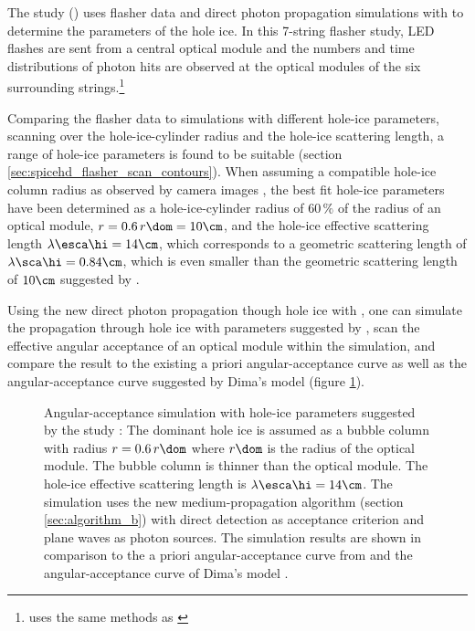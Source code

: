 The  study () uses flasher data and direct photon propagation simulations with \ppc to determine the parameters of the hole ice. In this 7-string flasher study, LED flashes are sent from a central optical module and the numbers and time distributions of photon hits are observed at the optical modules of the six surrounding strings.\footnote{ uses the same methods as \cite{icepaper,dimaslikelihood}}

Comparing the flasher data to simulations with different hole-ice parameters, scanning over the hole-ice-cylinder radius and the hole-ice scattering length, a range of hole-ice parameters is found to be suitable (section \ref{sec:spicehd_flasher_scan_contours}). When assuming a compatible hole-ice column radius as observed by camera images \cite{rongenswedishcamera}, the best fit hole-ice parameters have been determined as a hole-ice-cylinder radius of $60\,\%$ of the radius of an optical module, $r = 0.6\,r\dom = 10\cm$, and the hole-ice effective scattering length $\lambda\esca\hi = 14\cm$, which corresponds to a geometric scattering length of $\lambda\sca\hi = 0.84\cm$, which is even smaller than the geometric scattering length of $10\cm$ suggested by . \cite{martinspicehddard}

Using the new direct photon propagation though hole ice with \clsim, one can simulate the propagation through hole ice with parameters suggested by , scan the effective angular acceptance of an optical module within the simulation, and compare the result to the existing a priori angular-acceptance curve \cite{icepaper} as well as the angular-acceptance curve suggested by Dima's model \cite{flasherdataderivedicemodels} (figure \ref{fig:ku3Zie8z}).


\begin{figure}[htbp]
  \caption{Angular-acceptance simulation with hole-ice parameters suggested by the  study \cite{martinspicehddard}: The dominant hole ice is assumed as a bubble column with radius $r = 0.6\,r\dom$ where $r\dom$ is the radius of the optical module. The bubble column is thinner than the optical module. The hole-ice effective scattering length is $\lambda\esca\hi = 14\cm$. The simulation uses the new medium-propagation algorithm (section \ref{sec:algorithm_b}) with direct detection as acceptance criterion and plane waves as photon sources. The simulation results are shown in comparison to the a priori angular-acceptance curve from \cite{icepaper} and the angular-acceptance curve of Dima's model \cite{flasherdataderivedicemodels}.}
  \label{fig:ku3Zie8z}
\end{figure}

